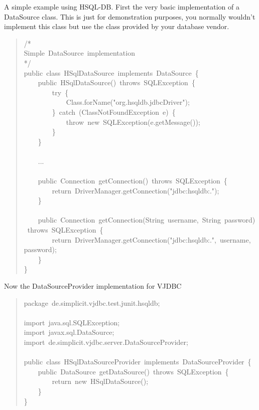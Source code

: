 \documentclass[10pt,a4paper,english]{article}
\begin{document}
A simple example using HSQL-DB. First the very basic implementation of a DataSource class. This is just for demonstration purposes, you normally wouldn't implement this class but use the class provided by your database vendor.
\begin{quote}{\ttfamily \raggedright \noindent
/*~\\
Simple~DataSource~implementation~\\
*/~\\
public~class~HSqlDataSource~implements~DataSource~{\{}~\\
~~~~public~HSqlDataSource()~throws~SQLException~{\{}~\\
~~~~~~~~try~{\{}~\\
~~~~~~~~~~~~Class.forName("org.hsqldb.jdbcDriver");~\\
~~~~~~~~{\}}~catch~(ClassNotFoundException~e)~{\{}~\\
~~~~~~~~~~~~throw~new~SQLException(e.getMessage());~\\
~~~~~~~~{\}}~\\
~~~~{\}}~\\
~\\
~~~~...~\\
~\\
~~~~public~Connection~getConnection()~throws~SQLException~{\{}~\\
~~~~~~~~return~DriverManager.getConnection("jdbc:hsqldb:.");~\\
~~~~{\}}~\\
~\\
~~~~public~Connection~getConnection(String~username,~String~password)~throws~SQLException~{\{}~\\
~~~~~~~~return~DriverManager.getConnection("jdbc:hsqldb:.",~username,~password);~\\
~~~~{\}}~\\
{\}}
}\end{quote}

Now the DataSourceProvider implementation for VJDBC
\begin{quote}{\ttfamily \raggedright \noindent
package~de.simplicit.vjdbc.test.junit.hsqldb;~\\
~\\
import~java.sql.SQLException;~\\
import~javax.sql.DataSource;~\\
import~de.simplicit.vjdbc.server.DataSourceProvider;~\\
~\\
public~class~HSqlDataSourceProvider~implements~DataSourceProvider~{\{}~\\
~~~~public~DataSource~getDataSource()~throws~SQLException~{\{}~\\
~~~~~~~~return~new~HSqlDataSource();~\\
~~~~{\}}~\\
{\}}
}\end{quote}
\end{document}
